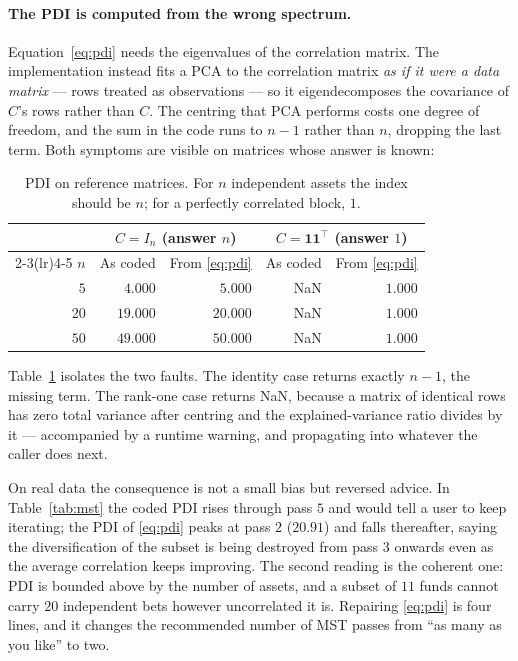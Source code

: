 \documentclass[11pt,a4paper]{article}
\begin{document}
\paragraph{The PDI is computed from the wrong spectrum.}
Equation~\eqref{eq:pdi} needs the eigenvalues of the correlation matrix. The
implementation instead fits a PCA \citep{pedregosa2011} to the correlation
matrix \emph{as if it were a data matrix} --- rows treated as observations ---
so it eigendecomposes the covariance of $C$'s rows rather than $C$. The
centring that PCA performs costs one degree of freedom, and the sum in the code
runs to $n-1$ rather than $n$, dropping the last term. Both symptoms are
visible on matrices whose answer is known:

\begin{table}[t]
\centering
\caption{PDI on reference matrices. For $n$ independent assets the index should
be $n$; for a perfectly correlated block, $1$.}
\label{tab:pdi}
\begin{tabular}{rrrrr}
\toprule
& \multicolumn{2}{c}{$C = I_n$ (answer $n$)} & \multicolumn{2}{c}{$C = \mathbf{1}\mathbf{1}^{\top}$ (answer $1$)} \\
\cmidrule(lr){2-3}\cmidrule(lr){4-5}
$n$ & As coded & From \eqref{eq:pdi} & As coded & From \eqref{eq:pdi} \\
\midrule
$5$  & $4.000$  & $5.000$  & NaN & $1.000$ \\
$20$ & $19.000$ & $20.000$ & NaN & $1.000$ \\
$50$ & $49.000$ & $50.000$ & NaN & $1.000$ \\
\bottomrule
\end{tabular}
\end{table}

Table~\ref{tab:pdi} isolates the two faults. The identity case returns exactly
$n-1$, the missing term. The rank-one case returns NaN, because a matrix of
identical rows has zero total variance after centring and the explained-variance
ratio divides by it --- accompanied by a runtime warning, and propagating into
whatever the caller does next.

On real data the consequence is not a small bias but reversed advice. In
Table~\ref{tab:mst} the coded PDI rises through pass $5$ and would tell a user
to keep iterating; the PDI of \eqref{eq:pdi} peaks at pass $2$ ($20.91$) and
falls thereafter, saying the diversification of the subset is being destroyed
from pass $3$ onwards even as the average correlation keeps improving. The
second reading is the coherent one: PDI is bounded above by the number of
assets, and a subset of $11$ funds cannot carry $20$ independent bets however
uncorrelated it is. Repairing \eqref{eq:pdi} is four lines, and it changes the
recommended number of MST passes from ``as many as you like'' to two.
\end{document}
